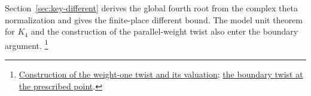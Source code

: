 Section~\ref{sec:key-different} derives the global fourth root from
the complex theta normalization and gives the finite-place different
bound. The model unit theorem for \(K_4\) and the construction of the
parallel-weight twist also enter the boundary argument.
\footnote{\href{https://github.com/ChristianKudeba/alpoge-rh-verification/blob/alpoge-source-7cbf7a0c/src/Development/AbelianVarietyTheory/Proofs/DivisorProofs/IntegralFramePointStalk.lean}{Construction of the weight-one twist and its valuation};
\href{https://github.com/ChristianKudeba/alpoge-rh-verification/blob/alpoge-source-7cbf7a0c/src/Development/AutomorphicArithmetic/ThetaCorrespondence/ThetaPairLifts/ThirdPlaceSeries/BoundaryValuationTwistInvariant.lean}{the boundary twist at the prescribed point}.}
